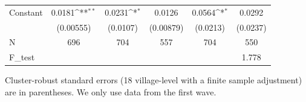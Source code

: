 \documentclass[fleqn,11pt]{article}
\newcommand{\sym}[1]{\rlap{$#1$}}
\def\sym#1{\ifmmode^{#1}\else\(^{#1}\)\fi
}
\begin{document}
\begin{table}[h]
\begin{adjustbox}{max width=\textwidth}
\begin{threeparttable}
\begin{tabular}{l*{5}{c}}
Constant            &      0.0181\sym{**} &      0.0231\sym{*}  &      0.0126         &      0.0564\sym{*}  &      0.0292         \\
                    &   (0.00555)         &    (0.0107)         &   (0.00879)         &    (0.0213)         &    (0.0237)         \\
\hline
N                   &         696         &         704         &         557         &         704         &         550         \\
F\_test              &                     &                     &                     &                     &       1.778         \\
\hline\hline
\end{tabular}
\begin{tablenotes}
\item Cluster-robust standard errors (18 village-level with a finite sample adjustment) are in parentheses. We only use data from the first wave. 
\end{tablenotes}
\end{threeparttable}
\end{adjustbox}
\end{table}
\end{document}
